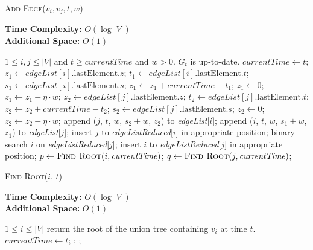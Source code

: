 \documentclass[12pt,abstract=true]{scrartcl}
\numberwithin{equation}{section}
\theoremstyle{definition}   \newtheorem{definition}{Definition}[section]
\theoremstyle{plain}        \newtheorem{theorem}{Theorem}[section]
\theoremstyle{plain}        \newtheorem{observation}{Observation}[section]
\theoremstyle{plain}        \newtheorem{fact}{Fact}[section]
\theoremstyle{plain}        \newtheorem{claim}{Claim}[section]
\theoremstyle{plain}        \newtheorem{lemma}[theorem]{Lemma}
\theoremstyle{plain}        \newtheorem{corollary}[theorem]{Corollary}
\theoremstyle{remark}       \newtheorem{example}{Example}[section]
\theoremstyle{remark}       \newtheorem{remark}{Remark}[section]
\begin{document}
\begin{algorithm}[htbp]
\caption{\textsc{Add Edge}($v_i,v_j,t,w$)}
\label{alg-add}
\textbf{Time Complexity:} $O(\log |V|)$\\
\textbf{Additional Space:} $O(1)$
\begin{algorithmic}[1]
\Require $1\leq i,j\leq |V|$ and $t\geq \mathit{currentTime}$ and $w>0$.
\Ensure $G_t$ is up-to-date.
\State $\mathit{currentTime}\gets t$;
\State $z_1\gets\mathit{edgeList}[i].\mathrm{lastElement}.z$;
\State $t_1\gets\mathit{edgeList}[i].\mathrm{lastElement}.t$;
\State $s_1\gets\mathit{edgeList}[i].\mathrm{lastElement}.s$;
\State $z_1\gets z_1+\mathit{currentTime}-t_1$;
 \State $z_1\gets 0$;\EndIf
\State $z_1\gets z_1-\eta\cdot w$;
\State $z_2\gets\mathit{edgeList}[j].\mathrm{lastElement}.z$;
\State $t_2\gets\mathit{edgeList}[j].\mathrm{lastElement}.t$;
\State $z_2\gets z_2+\mathit{currentTime}-t_2$;
\State $s_2\gets\mathit{edgeList}[j].\mathrm{lastElement}.s$;
 \State $z_2\gets 0$;\EndIf
\State $z_2\gets z_2-\eta\cdot w$;
\State append ($j$, $t$, $w$, $s_2+w$, $z_2$) to \textit{edgeList}[$i$];
\State append ($i$, $t$, $w$, $s_1+w$, $z_1$) to \textit{edgeList}[$j$];
\State insert $j$ to \textit{edgeListReduced}[$i$] in appropriate position;
\State binary search $i$ on \textit{edgeListReduced}[$j$];
\State insert $i$ to \textit{edgeListReduced}[$j$] in appropriate position;
\EndIf
\State $p\gets \Call{Find Root}{i,\mathit{currentTime}}$;
\State $q\gets \Call{Find Root}{j,\mathit{currentTime}}$;
\State {}
\EndIf
\end{algorithmic}
\end{algorithm}

\begin{algorithm}[htbp]
\caption{\textsc{Find Root}($i$, $t$)}\label{alg-find}
\textbf{Time Complexity:} $O(\log |V|)$\\
\textbf{Additional Space:} $O(1)$
\begin{algorithmic}[1]
\Require $1\leq i\leq |V|$
\Ensure return the root of the union tree containing $v_i$ at time $t$.
\State $\mathit{currentTime}\gets t$;
	\State {};
\Else
	\State {};
\EndIf
\end{algorithmic}
\end{algorithm}
\end{document}
